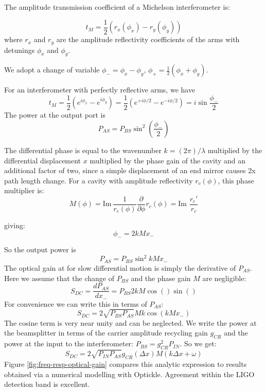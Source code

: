 The amplitude transmission coefficient of a Michelson interferometer
is:

\begin{equation}
t_{M}=\frac{1}{2}\left(r_{x}\left(\phi_{x}\right)-r_{y}\left(\phi_{y}\right)\right)\end{equation}
where $r_{x}$ and $r_{y}$ are the amplitude reflectivity coefficients
of the arms with detunings $\phi_{x}$ and $\phi_{y}$. 

We adopt a change of variable $\phi_{-}=\phi_{x}-\phi_{y}$, $\phi_{+}=\frac{1}{2}\left(\phi_{x}+\phi_{y}\right)$.

For an interferometer with perfectly reflective arms, we have\begin{equation}
t_{M}=\frac{1}{2}\left(e^{i\phi_{x}}-e^{i\phi_{y}}\right)=\frac{1}{2}\left(e^{+i\phi/2}-e^{-i\phi/2}\right)=i\sin\frac{\phi_{-}}{2}\end{equation}
The power at the output port is \begin{equation}
P_{AS}=P_{BS}\sin^{2}\left(\frac{\phi_{-}}{2}\right)\end{equation}


The differential phase is equal to the wavenumber $k=(2\pi)/\lambda$
multiplied by the differential displacement $x$ multiplied by the
phase gain of the cavity and an additional factor of two, since a
simple displacement of an end mirror causes 2x path length change.
For a cavity with amplitude reflectivity $r_{c}(\phi)$, this phase
multiplier is:\[
M(\phi)=\mathrm{Im\ }\frac{1}{r_{c}(\phi)}\frac{\partial}{\partial\phi}r_{c}(\phi)=\text{Im\ }\frac{r_{c}'}{r_{c}}\]


giving:\[
\phi_{-}=2kMx_{-}\]


So the output power is\begin{equation}
P_{AS}=P_{BS}\sin^{2}kMx_{-}\end{equation}
 The optical gain at for slow differential motion is simply the derivative
of $P_{AS}$. Here we assume that the change of $P_{BS}$ and the
phase gain $M$ are negligible: \begin{equation}
S_{DC}=\frac{dP_{AS}}{dx_{-}}=P_{BS}2kM\cos()\sin()\end{equation}
For convenience we can write this in terms of $P_{AS}$:\begin{equation}
S_{DC}=2\sqrt{P_{BS}P_{AS}}Mk\cos\left(kMx_{-}\right)\end{equation}
The cosine term is very near unity and can be neglected. We write
the power at the beamsplitter in terms of the carrier amplitude recycling
gain $g_{CR}$ and the power at the input to the interferometer: $P_{BS}=g_{CR}^{2}P_{IN}$.
So we get:\begin{equation}
S_{DC}=2\sqrt{P_{IN}P_{AS}}g_{CR}(\Delta x)M(k\Delta x+\omega)\end{equation}
Figure \ref{fig:freq-resp-optical-gain} compares this analytic expression
to results obtained via a numerical modelling with Optickle. Agreement
within the LIGO detection band is excellent.


